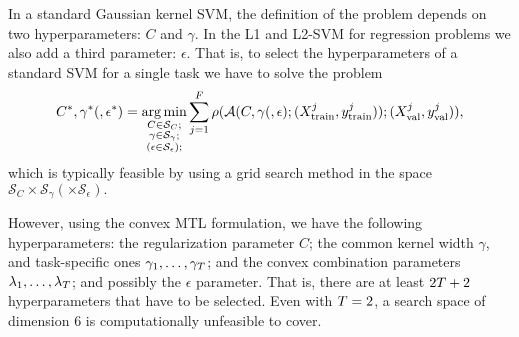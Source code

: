%
In a standard Gaussian kernel SVM, the definition of the problem depends on two hyperparameters: $C$ and $\gamma$.
In the L1 and L2-SVM for regression problems we also add a third parameter: $\epsilon$. 
That is, to select the hyperparameters of a standard SVM for a single task we have to solve the problem
\begin{equation}
    \nonumber
    C^*, \gamma^* (, \epsilon^*) = \operatorname*{arg\min}_{\substack{C \in \mathcal{S}_C ; \\ \substack{\gamma \in \mathcal{S}_\gamma} ; \\ \left(\substack{\epsilon \in \mathcal{S}_\epsilon} \right); }}
     \sum_{j=1}^{F} \rho(\mathcal{A}(C, \gamma (, \epsilon); (X^j_\text{train}, y^j_\text{train})); (X^j_\text{val}, y^j_\text{val})) ,
\end{equation}
which is typically feasible by using a grid search method in the space $\mathcal{S}_{C} \times \mathcal{S}_{\gamma} (\times \mathcal{S}_{\epsilon}) .$
%

However, using the convex MTL formulation, 
we have the following hyperparameters: the regularization parameter $C$; the common kernel width $\gamma$, and task-specific ones $\gamma_1, \ldots, \gamma_T$; and the convex combination parameters $\lambda_1, \ldots, \lambda_T$; and possibly the $\epsilon$ parameter. That is, there are at least $2T + 2$ hyperparameters that have to be selected. Even with $T=2$, a search space of dimension $6$ is computationally unfeasible to cover.

